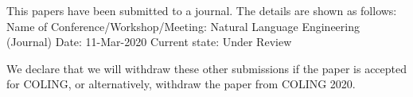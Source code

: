 This papers have been submitted to a journal. The details are shown as follows:
Name of Conference/Workshop/Meeting: Natural Language Engineering (Journal)
Date: 11-Mar-2020
Current state: Under Review

We declare that we will withdraw these other submissions if the paper is accepted for COLING, or alternatively, withdraw the paper from COLING 2020. 
